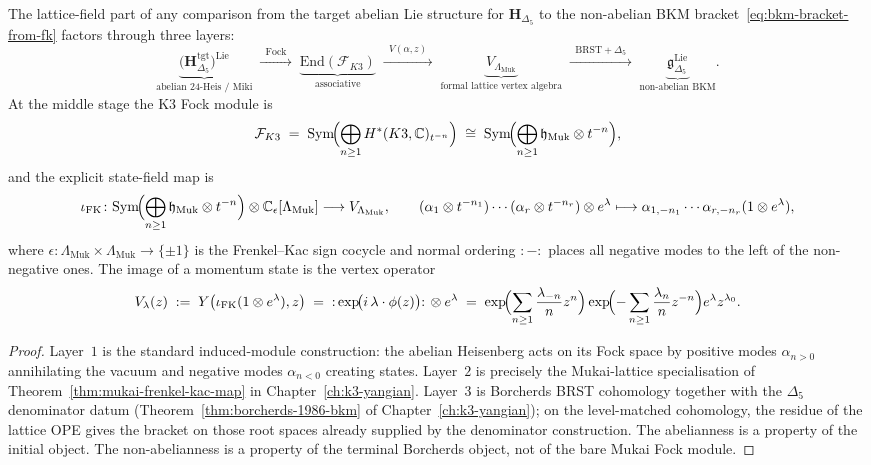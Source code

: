 \begin{proposition}
\label{prop:frenkel-kac-explicit-map}
The lattice-field part of any comparison from the target abelian Lie
structure for $\mathbf{H}_{\Delta_5}$ to the non-abelian BKM
bracket~\eqref{eq:bkm-bracket-from-fk} factors through three layers:
\[
\underbrace{\bigl(\mathbf{H}_{\Delta_5}^{\mathrm{tgt}}\bigr)^{\mathrm{Lie}}}_{\text{abelian 24-Heis / Miki}}
\;\xrightarrow{\;\;\mathrm{Fock}\;\;}\;
\underbrace{\mathrm{End}(\mathcal{F}_{K3})}_{\text{associative}}
\;\xrightarrow{\;\;V(\alpha,z)\;\;}\;
	\underbrace{V_{\Lambda_{\mathrm{Muk}}}}_{\text{formal lattice vertex algebra}}
\;\xrightarrow{\;\;\mathrm{BRST}+\Delta_5\;\;}\;
\underbrace{\mathfrak{g}_{\Delta_5}^{\mathrm{Lie}}}_{\text{non-abelian BKM}}.
\]
At the middle stage the K3 Fock module is
\[
 \mathcal{F}_{K3}
 \;=\;
 \mathrm{Sym}\!\Bigl(\bigoplus_{n\geq 1} H^*(K3,\mathbb{C})_{t^{-n}}\Bigr)
 \;\cong\;
 \mathrm{Sym}\!\Bigl(\bigoplus_{n\geq 1}\mathfrak{h}_{\mathrm{Muk}}\otimes t^{-n}\Bigr),
\]
and the explicit state-field map is
\[
 \iota_{\mathrm{FK}}\colon
 \mathrm{Sym}\!\Bigl(\bigoplus_{n\geq 1}\mathfrak{h}_{\mathrm{Muk}}\otimes t^{-n}\Bigr)
 \otimes \mathbb{C}_\epsilon[\Lambda_{\mathrm{Muk}}]
 \longrightarrow
 V_{\Lambda_{\mathrm{Muk}}},
 \qquad
 (\alpha_1\otimes t^{-n_1})\cdots(\alpha_r\otimes t^{-n_r})\otimes e^\lambda
 \longmapsto
 \alpha_{1,-n_1}\cdots\alpha_{r,-n_r}(1\otimes e^\lambda),
\]
where $\epsilon\colon\Lambda_{\mathrm{Muk}}\times\Lambda_{\mathrm{Muk}}\to\{\pm 1\}$
is the Frenkel--Kac sign cocycle and normal ordering $:{-}:$ places all negative
modes to the left of the non-negative ones. The image of a momentum state is the
vertex operator
\[
 V_\lambda(z)
 \;:=\;
 Y\bigl(\iota_{\mathrm{FK}}(1\otimes e^\lambda),z\bigr)
 \;=\;
 {:}\exp\!\bigl(i\,\lambda\cdot\phi(z)\bigr){:}\,\otimes e^\lambda
 \;=\;
 \exp\!\Bigl(\sum_{n\geq 1}\frac{\lambda_{-n}}{n}z^n\Bigr)
 \exp\!\Bigl(-\sum_{n\geq 1}\frac{\lambda_n}{n}z^{-n}\Bigr)
 e^\lambda z^{\lambda_0}.
\]
\end{proposition}

\begin{proof}
Layer~$1$ is the standard induced-module construction: the abelian Heisenberg acts on
its Fock space by positive modes $\alpha_{n>0}$ annihilating the vacuum and negative
modes $\alpha_{n<0}$ creating states. Layer~$2$ is precisely the Mukai-lattice
specialisation of Theorem~\ref{thm:mukai-frenkel-kac-map} in
Chapter~\ref{ch:k3-yangian}. Layer~$3$ is Borcherds BRST cohomology together
with the $\Delta_5$ denominator datum (Theorem~\ref{thm:borcherds-1986-bkm}
of Chapter~\ref{ch:k3-yangian}); on the level-matched cohomology, the residue
of the lattice OPE gives the bracket on those root spaces already supplied by
the denominator construction. The abelianness is a property of the initial
object. The non-abelianness is a property of the terminal Borcherds object,
not of the bare Mukai Fock module.
\end{proof}

